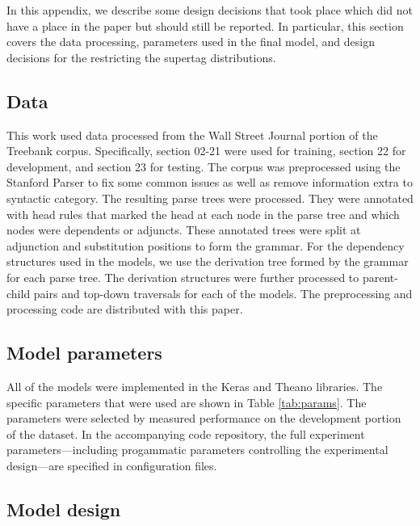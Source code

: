 \documentclass[11pt]{article}
\begin{document}
In this appendix, we describe some design decisions that took place which did not have a place in the paper but should still be reported.  In particular, this section covers the data processing, parameters used in the final model, and design decisions for the restricting the supertag distributions. 

\subsection{Data}

This work used data processed from the Wall Street Journal portion of the Treebank corpus. Specifically, section 02-21 were used for training, section 22 for development, and section 23 for testing.  The corpus was preprocessed using the Stanford Parser to fix some common issues as well as remove information extra to syntactic category.  The resulting parse trees were processed.  They were annotated with head rules that marked the head at each node in the parse tree and which nodes were dependents or adjuncts.  These annotated trees were split at adjunction and substitution positions to form the grammar.  For the dependency structures used in the models, we use the derivation tree formed by the grammar for each parse tree.  The derivation structures were further processed to parent-child pairs and top-down traversals for each of the models.  The preprocessing and processing code are distributed with this paper. 

\subsection{Model parameters}

All of the models were implemented in the Keras \cite{chollet2015keras} and Theano \cite{theano} libraries.  The specific parameters that were used are shown in Table \ref{tab:params}.  The parameters were selected by measured performance on the development portion of the dataset.  In the accompanying code repository, the full experiment parameters---including progammatic parameters controlling the experimental design---are specified in configuration files. 

\subsection{Model design}
\end{document}
